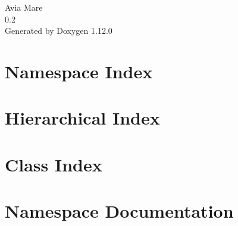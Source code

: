 \documentclass[twoside]{book}
\newcommand{\+}{\discretionary{\mbox{\scriptsize$\hookleftarrow$}}{}{}}
\newcommand{\clearemptydoublepage}{%
    \newpage{\pagestyle{empty}\cleardoublepage}%
  }
\begin{document}
  \raggedbottom
    \hypersetup{pageanchor=false,
                bookmarksnumbered=true,
                pdfencoding=unicode
               }
  \begin{titlepage}
  \vspace*{7cm}
  \begin{center}%
  {\Large Avia Mare}\\
  [1ex]\large 0.\+2 \\
  \vspace*{1cm}
  {\large Generated by Doxygen 1.12.0}\\
  \end{center}
  \end{titlepage}
  \clearemptydoublepage
  \tableofcontents
  \clearemptydoublepage
  \hypersetup{pageanchor=true}


\chapter{Namespace Index}

\chapter{Hierarchical Index}

\chapter{Class Index}

\chapter{Namespace Documentation}




















\end{document}
